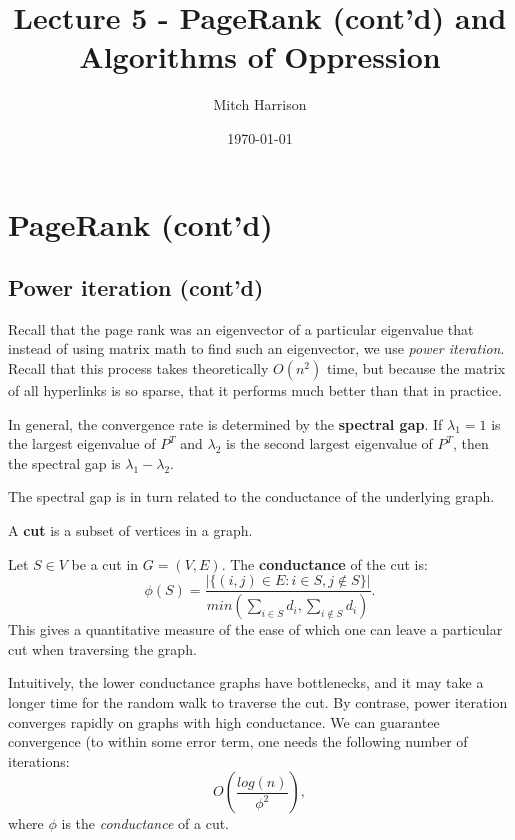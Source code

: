 \documentclass[titlepage, 12pt, leqno]{article}
\title{\Huge{Lecture 5 - PageRank (cont'd) and Algorithms of Oppression}}
\author{\large{Mitch Harrison}}
\date{\today}
\begin{document}
\setlength{\parskip}{1\baselineskip}
\setlength{\parindent}{15pt}
\maketitle
\tableofcontents
\newpage


\section{PageRank (cont'd)}

\subsection{Power iteration (cont'd)}
Recall that the page rank was an eigenvector of a particular eigenvalue that
instead of using matrix math to find such an eigenvector, we use \textit{power
iteration}. Recall that this process takes theoretically $O(n^{2})$ time, but 
because the matrix of all hyperlinks is so sparse, that it performs much better
than that in practice.

\begin{definition}
In general, the convergence rate is determined by the \textbf{spectral gap}. If $\lambda_{1} = 1$ is the largest eigenvalue of $P^{T}$ and $\lambda_{2}$ is the
second largest eigenvalue of $P^{T}$, then the spectral gap is $\lambda_{1} -
\lambda_{2}$.
\end{definition}

The spectral gap is in turn related to the conductance of the underlying graph.

\begin{definition}
    A \textbf{cut} is a subset of vertices in a graph.
\end{definition}

\begin{definition}
    Let $S \in V$ be a cut in $G = (V,E)$. The \textbf{conductance} of the cut is:
    \[
        \phi (S) = \frac{|\{(i,j) \in  E: i \in S, j \notin S\}|}{
        min(\sum_{i \in S}d_{i}, \sum_{i \notin S}d_{i})}.
    \]
    This gives a quantitative measure of the ease of which one can leave a
    particular cut when traversing the graph.
\end{definition}

Intuitively, the lower conductance graphs have bottlenecks, and it may take a
longer time for the random walk to traverse the cut. By contrase, power iteration
converges rapidly on graphs with high conductance. We can guarantee convergence 
(to within some error term, one needs the following number of iterations:
\[
    O\left(\frac{log(n)}{\phi^{2}}\right),
\]
where $\phi $ is the \textit{conductance} of a cut.
\end{document}
